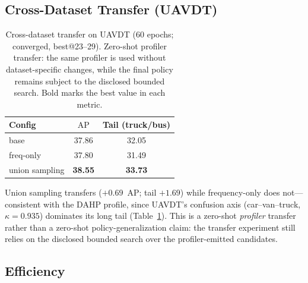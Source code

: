 \documentclass[journal]{IEEEtran}
\newcommand{\ap}{\ensuremath{\mathrm{AP}}}
\newcommand{\uavdt}{UAVDT}
\begin{document}
\subsection{Cross-Dataset Transfer (\uavdt{})}
\label{sec:uavdt}
\begin{table}[!t]
\centering
\caption{Cross-dataset transfer on \uavdt{} (60 epochs; converged, best@23--29). Zero-shot profiler transfer: the same profiler is used without dataset-specific changes, while the final policy remains subject to the disclosed bounded search. Bold marks the best value in each metric.}
\label{tab:uavdt}
\begin{tabular}{lcc}
\toprule
Config & \ap & Tail (truck/bus) \\
\midrule
base & 37.86 & 32.05 \\
freq-only & 37.80 & 31.49 \\
union sampling & \textbf{38.55} & \textbf{33.73} \\
\bottomrule
\end{tabular}
\end{table}
Union sampling transfers ($+0.69$~\ap; tail $+1.69$) while frequency-only does not---consistent with the DAHP profile, since \uavdt{}'s confusion axis (car--van--truck, $\kappa{=}0.935$) dominates its long tail (Table~\ref{tab:uavdt}). This is a zero-shot \emph{profiler} transfer rather than a zero-shot policy-generalization claim: the transfer experiment still relies on the disclosed bounded search over the profiler-emitted candidates.

\subsection{Efficiency}
\label{sec:efficiency}
\end{document}
